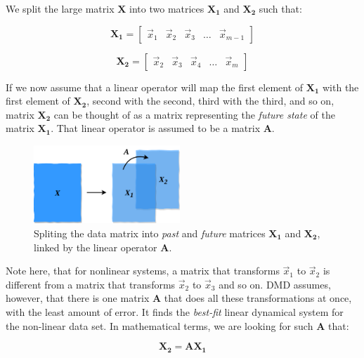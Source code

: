 \documentclass[10pt,twocolumn]{article}
\begin{document}
We split the large matrix $\bm{X}$ into two matrices $\bm{X_1}$ and $\bm{X_2}$ such that:

\begin{equation} \label{eq:X1}
\bm{X_1} = 
\begin{bmatrix}
    \vec{x}_1 & \vec{x}_2 & \vec{x}_3 & \dots & \vec{x}_{m-1}
\end{bmatrix}
\end{equation}

\begin{equation} \label{eq:X2}
\bm{X_2} = 
\begin{bmatrix}
    \vec{x}_2 & \vec{x}_3 & \vec{x}_4 & \dots & \vec{x}_{m}
\end{bmatrix}
\end{equation}

If we now assume that a linear operator will map the first element of $\bm{X_1}$ with the first element of $\bm{X_2}$, second with the second, third with the third, and so on, matrix $\bm{X_2}$ can be thought of as a matrix representing the \textit{future state} of the matrix $\bm{X_1}$. That linear operator is assumed to be a matrix $\bm{A}$. 

\begin{figure}[H]
\centering\includegraphics[width=5.5cm]{data-split.png}
\caption{Spliting the data matrix into \textit{past} and \textit{future} matrices $\bm{X_1}$ and $\bm{X_2}$, linked by the linear operator $\bm{A}$.}
\label{fig:linear_system}
\end{figure}

Note here, that for nonlinear systems, a matrix that transforms $\vec{x}_1$ to $\vec{x}_2$ is different from a matrix that transforms $\vec{x}_2$ to $\vec{x}_3$ and so on. DMD assumes, however, that there is one matrix $\bm{A}$ that does all these transformations at once, with the least amount of error. It finds the \textit{best-fit} linear dynamical system for the non-linear data set. In mathematical terms, we are looking for such $\bm{A}$ that:

\begin{equation} \label{eq:linear_dynamics}
\bm{X_2} = \bm{A} \bm{X_1}
\end{equation}
\end{document}

